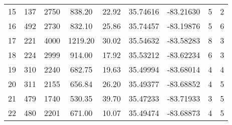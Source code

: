 \begin{table}[p]
\begin{tabular}{ccccccccc}
15 & 137                                                 & 2750                                                          & 838.20                                                       & 22.92 & 35.74616 & -83.21630 & 5                                                                                      & 2 \\ 
16 & 492                                                 & 2730                                                          & 832.10                                                       & 25.86 & 35.74457 & -83.19876 & 5                                                                                      & 6 \\ 
17 & 221                                                 & 4000                                                          & 1219.20                                                     & 30.02 & 35.54632 & -83.58283 & 8                                                                                      & 3 \\ 
18 & 224                                                 & 2999                                                          & 914.00                                                       & 17.92 & 35.53212 & -83.62234 & 6                                                                                      & 3 \\ 
19 & 310                                                 & 2240                                                          & 682.75                                                       & 19.63 & 35.49994 & -83.68014 & 4                                                                                      & 4 \\ 
20 & 311                                                 & 2155                                                          & 656.84                                                       & 26.20 & 35.49377 & -83.68852 & 4                                                                                      & 5 \\ 
21 & 479                                                 & 1740                                                          & 530.35                                                       & 39.70 & 35.47233 & -83.71933 & 3                                                                                      & 5 \\ 
22 & 480                                                 & 2201                                                          & 671.00                                                       & 10.07 & 35.49474 & -83.68873 & 4                                                                                      & 5 \\ 

\end{tabular}
\end{table}
